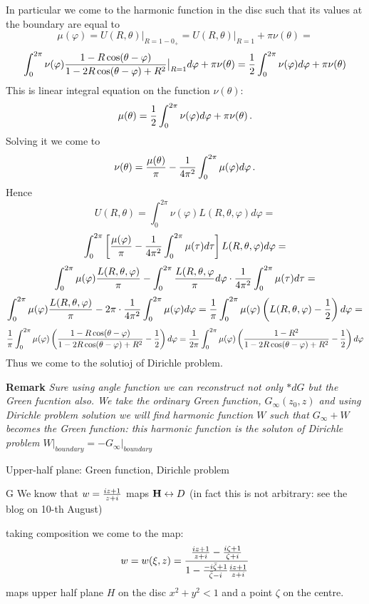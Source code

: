 In particular we come to the harmonic function
in the disc such that its values at the boundary are equal to
        $$
\mu(\varphi)=
    U(R,\theta)\big\vert_{R=1-0_+}=
    U(R,\theta)\big\vert_{R=1}+\pi\nu(\theta)=
       $$
       $$
\int_0^{2\pi}\nu(\varphi)
    {1-R\cos(\theta-\varphi)\over 
1-2R\cos(\theta-\varphi)+R^2}\big\vert_{R=1}d\varphi+
\pi\nu(\theta)=
   {1\over 2}\int_0^{2\pi}\nu(\varphi)
    d\varphi+
\pi\nu(\theta)
        $$
This is linear integral equation on the function  
$\nu(\theta)$:
       $$
\mu(\theta)=
     {1\over 2}\int_0^{2\pi}\nu(\varphi)
    d\varphi+
\pi\nu(\theta)\,.
        $$
Solving it we come to
        $$
\nu(\theta)={\mu(\theta)\over \pi}-{1\over 4\pi^2}
\int_0^{2\pi}\mu(\varphi)d\varphi\,.
         $$
Hence   $$
     U(R,\theta)=
\int_0^{2\pi}\nu(\varphi)
    L(R,\theta,\varphi)d\varphi=
        $$
        $$
\int_0^{2\pi}\left[
   {\mu(\varphi)\over \pi}-{1\over 4\pi^2}
\int_0^{2\pi}\mu(\tau)d\tau\right]
    L(R,\theta,\varphi)d\varphi=
       $$
       $$
\int_0^{2\pi}\mu(\varphi){L(R,\theta,\varphi)\over \pi}-
\int_0^{2\pi}{L(R,\theta,\varphi\over \pi}d\varphi\cdot
 {1\over 4\pi^2}\int_0^{2\pi}\mu(\tau)d\tau=
        $$
        $$
\int_0^{2\pi}\mu(\varphi){L(R,\theta,\varphi)\over \pi}-
2\pi\cdot
 {1\over 4\pi^2}\int_0^{2\pi}\mu(\varphi)d\varphi=
{1\over \pi}
  \int_0^{2\pi}\mu(\varphi)
  \left(L(R,\theta,\varphi)-{1\over 2}\right)d\varphi=
              $$
         $$
       {1\over \pi}
  \int_0^{2\pi}\mu(\varphi)
  \left({1-R\cos(\theta-\varphi)\over 
1-2R\cos(\theta-\varphi)+R^2}-{1\over 2}\right)d\varphi
       =
 {1\over 2\pi}
  \int_0^{2\pi}\mu(\varphi)
  \left({1-R^2\over 
1-2R\cos(\theta-\varphi)+R^2}-{1\over 2}\right)d\varphi
         $$
Thus we come to the solutioj of Dirichle problem.

{\bf Remark} {\it Sure using angle function we can reconstruct
not only $*dG$ but the Green fucntion also.
We take the ordinary Green function, $G_\infty(z_0,z)$
and using Dirichle problem solution we will find harmonic
function $W$ such that $G_\infty+W$ becomes the Green function:
  this harmonic function is the soluton of
Dirichle problem $W\big\vert_{boundary}=-
G_\infty\big\vert_{boundary}$
}

\bigskip

\centerline{Upper-half plane: Green function, Dirichle problem}
G
We know that $w={iz+1\over z+i}$ maps ${\bf H}\leftrightarrow D$
  (in fact this is not arbitrary: see the blog on 10-th August)

taking composition we come to the map:
        $$
w=w(\xi,z)={{iz+1\over z+i}-{i\zeta+1\over \zeta+i}
        \over 
 1-{-i\bar\zeta+1\over \bar\zeta-i}{iz+1\over z+i} }
        $$
maps upper half plane $H$ on the disc $x^2+y^2<1$
and a point $\zeta$ on the centre.

